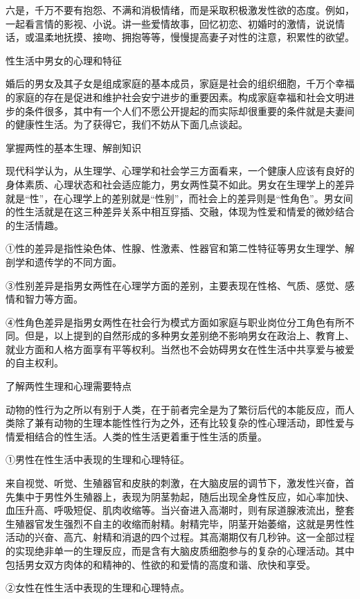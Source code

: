 \documentclass[12pt,UTF8,openany]{ctexbook}
\begin{document}
六是，千万不要有抱怨、不满和消极情绪，而是采取积极激发性欲的态度。例如，一起看言情的影视、小说。讲一些爱情故事，回忆初恋、初婚时的激情，说说情话，或温柔地抚摸、接吻、拥抱等等，慢慢提高妻子对性的注意，积累性的欲望。





性生活中男女的心理和特征


婚后的男女及其子女是组成家庭的基本成员，家庭是社会的组织细胞，千万个幸福的家庭的存在是促进和维护社会安宁进步的重要因素。构成家庭幸福和社会文明进步的条件很多，其中有一个人们不愿公开提起的而实际却很重要的条件就是夫妻间的健康性生活。为了获得它，我们不妨从下面几点谈起。

掌握两性的基本生理、解剖知识

现代科学认为，从生理学、心理学和社会学三方面看来，一个健康人应该有良好的身体素质、心理状态和社会适应能力，男女两性莫不如此。男女在生理学上的差异就是“性”，在心理学上的差别就是“性别”，而社会上的差异则是“性角色”。男女间的性生活就是在这三种差异关系中相互穿插、交融，体现为性爱和情爱的微妙结合的生活情趣。

①性的差异是指性染色体、性腺、性激素、性器官和第二性特征等男女生理学、解剖学和遗传学的不同方面。

③性别差异是指男女两性在心理学方面的差别，主要表现在性格、气质、感觉、感情和智力等方面。

④性角色差异是指男女两性在社会行为模式方面如家庭与职业岗位分工角色有所不同。但是，以上提到的自然形成的多种男女差别绝不影响男女在政治上、教育上、就业方面和人格方面享有平等权利。当然也不会妨碍男女在性生活中共享爱与被爱的自主权利。

了解两性生理和心理需要特点

动物的性行为之所以有别于人类，在于前者完全是为了繁衍后代的本能反应，而人类除了兼有动物的生理本能性性行为之外，还有比较复杂的性心理活动，即性爱与情爱相结合的性生活。人类的性生活更着重于性生活的质量。

①男性在性生活中表现的生理和心理特征。

来自视觉、听觉、生殖器官和皮肤的刺激，在大脑皮层的调节下，激发性兴奋，首先集中于男性外生殖器上，表现为阴茎勃起，随后出现全身性反应，如心率加快、血压升高、呼吸短促、肌肉收缩等。当兴奋进入高潮时，则有尿道腺液流出，整套生殖器官发生强烈不自主的收缩而射精。射精完毕，阴茎开始萎缩，这就是男性性活动的兴奋、高亢、射精和消退的四个过程。其高潮期仅有几秒钟。这一全部过程的实现绝非单一的生理反应，而是含有大脑皮质细胞参与的复杂的心理活动。其中包括男女双方肉体的和精神的、性欲的和爱情的高度和谐、欣快和享受。

②女性在性生活中表现的生理和心理特点。
\end{document}
